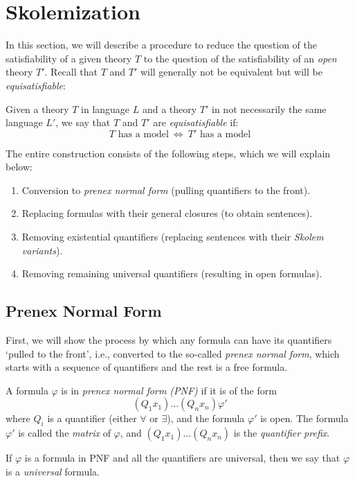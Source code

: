 \section{Skolemization}\label{section:skolemization}

In this section, we will describe a procedure to reduce the question of the satisfiability of a given theory $T$ to the question of the satisfiability of an \emph{open} theory $T'$. Recall that $T$ and $T'$ will generally not be equivalent but will be \emph{equisatisfiable}:

\begin{definition}[Equisatisfiability]
Given a theory $T$ in language $L$ and a theory $T'$ in not necessarily the same language $L'$, we say that $T$ and $T'$ are \emph{equisatisfiable} if:
$$
\text{$T$ has a model}\ \Leftrightarrow\ \text{$T'$ has a model}
$$
\end{definition}

The entire construction consists of the following steps, which we will explain below:
\begin{enumerate}
    \item Conversion to \emph{prenex normal form} (pulling quantifiers to the front).
    \item Replacing formulas with their general closures (to obtain sentences).
    \item Removing existential quantifiers (replacing sentences with their \emph{Skolem variants}).
    \item Removing remaining universal quantifiers (resulting in open formulas).
\end{enumerate}

\subsection{Prenex Normal Form}

First, we will show the process by which any formula can have its quantifiers `pulled to the front', i.e., converted to the so-called \emph{prenex normal form}, which starts with a sequence of quantifiers and the rest is a free formula.

\begin{definition}[PNF]
    A formula $\varphi$ is in \emph{prenex normal form (PNF)} if it is of the form
    $$
    (Q_1x_1)\dots(Q_nx_n)\varphi'
    $$
    where $Q_i$ is a quantifier (either $\forall$ or $\exists$), and the formula $\varphi'$ is open. The formula $\varphi'$ is called the \emph{matrix} of $\varphi$, and $(Q_1x_1)\dots(Q_nx_n)$ is the \emph{quantifier prefix}. 
    
    If $\varphi$ is a formula in PNF and all the quantifiers are universal, then we say that $\varphi$ is a \emph{universal} formula.
\end{definition}

